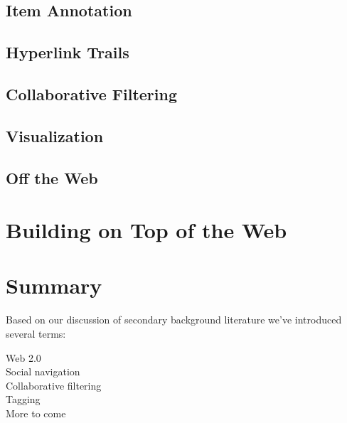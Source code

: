 \subsection{Item Annotation}

\subsection{Hyperlink Trails}

\subsection{Collaborative Filtering}

\subsection{Visualization}

\subsection{Off the Web}

\section{Building on Top of the Web}

\section{Summary}

Based on our discussion of secondary background literature we've introduced
several terms:

\begin{description}
  \item[Web 2.0]
  \item[Social navigation]
  \item[Collaborative filtering]
  \item[Tagging]
  \item[More to come]
\end{description}
